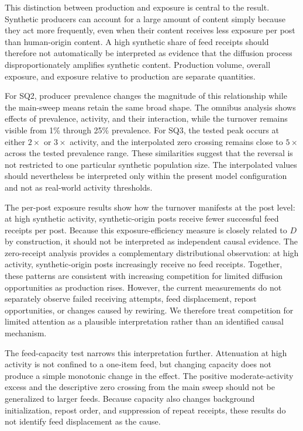 \documentclass[runningheads]{llncs}
\begin{document}
This distinction between production and exposure is central to the result. Synthetic producers can account for a large amount of content simply because they act more frequently, even when their content receives less exposure per post than human-origin content. A high synthetic share of feed receipts should therefore not automatically be interpreted as evidence that the diffusion process disproportionately amplifies synthetic content. Production volume, overall exposure, and exposure relative to production are separate quantities.

For SQ2, producer prevalence changes the magnitude of this relationship while the main-sweep means retain the same broad shape. The omnibus analysis shows effects of prevalence, activity, and their interaction, while the turnover remains visible from 1\% through 25\% prevalence. For SQ3, the tested peak occurs at either \(2\times\) or \(3\times\) activity, and the interpolated zero crossing remains close to \(5\times\) across the tested prevalence range. These similarities suggest that the reversal is not restricted to one particular synthetic population size. The interpolated values should nevertheless be interpreted only within the present model configuration and not as real-world activity thresholds.

The per-post exposure results show how the turnover manifests at the post level: at high synthetic activity, synthetic-origin posts receive fewer successful feed receipts per post. Because this exposure-efficiency measure is closely related to \(D\) by construction, it should not be interpreted as independent causal evidence. The zero-receipt analysis provides a complementary distributional observation: at high activity, synthetic-origin posts increasingly receive no feed receipts. Together, these patterns are consistent with increasing competition for limited diffusion opportunities as production rises. However, the current measurements do not separately observe failed receiving attempts, feed displacement, repost opportunities, or changes caused by rewiring. We therefore treat competition for limited attention as a plausible interpretation rather than an identified causal mechanism.

The feed-capacity test narrows this interpretation further. Attenuation at high activity is not confined to a one-item feed, but changing capacity does not produce a simple monotonic change in the effect. The positive moderate-activity excess and the descriptive zero crossing from the main sweep should not be generalized to larger feeds. Because capacity also changes background initialization, repost order, and suppression of repeat receipts, these results do not identify feed displacement as the cause.
\end{document}
